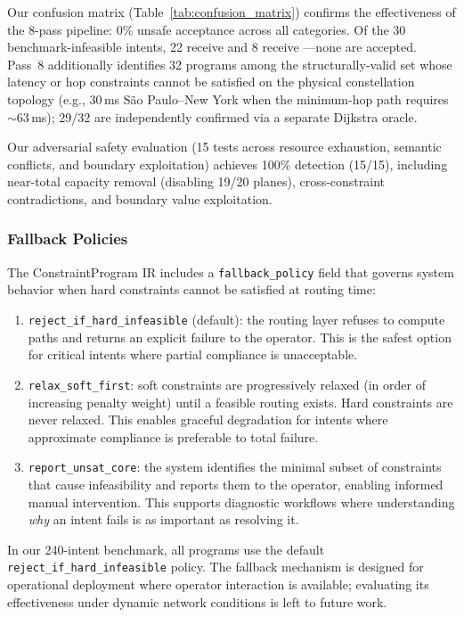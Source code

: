 \noindent Our confusion matrix (Table~\ref{tab:confusion_matrix})
confirms the effectiveness of the 8-pass pipeline: 0\% unsafe acceptance
across all categories. Of the 30 benchmark-infeasible intents, 22 receive
 and 8 receive ---none are accepted.
Pass~8 additionally identifies 32 programs among the structurally-valid
set whose latency or hop constraints cannot be satisfied on the physical
constellation topology (e.g., 30\,ms S\~{a}o Paulo--New York when the
minimum-hop path requires $\sim$63\,ms); 29/32 are independently
confirmed via a separate Dijkstra oracle.

Our adversarial safety evaluation (15 tests across resource exhaustion,
semantic conflicts, and boundary exploitation) achieves 100\% detection
(15/15), including near-total capacity removal (disabling 19/20 planes),
cross-constraint contradictions, and boundary value exploitation.

\subsubsection{Fallback Policies}

The ConstraintProgram IR includes a \texttt{fallback\_policy} field that
governs system behavior when hard constraints cannot be satisfied at
routing time:

\begin{enumerate}
\item \texttt{reject\_if\_hard\_infeasible} (default): the routing layer
refuses to compute paths and returns an explicit failure to the operator.
This is the safest option for critical intents where partial compliance
is unacceptable.

\item \texttt{relax\_soft\_first}: soft constraints are progressively
relaxed (in order of increasing penalty weight) until a feasible routing
exists. Hard constraints are never relaxed. This enables graceful
degradation for intents where approximate compliance is preferable to
total failure.

\item \texttt{report\_unsat\_core}: the system identifies the minimal
subset of constraints that cause infeasibility and reports them to the
operator, enabling informed manual intervention. This supports
diagnostic workflows where understanding \textit{why} an intent fails
is as important as resolving it.
\end{enumerate}

\noindent In our 240-intent benchmark, all programs use the default
\texttt{reject\_if\_hard\_infeasible} policy. The fallback mechanism
is designed for operational deployment where operator interaction is
available; evaluating its effectiveness under dynamic network conditions
is left to future work.

